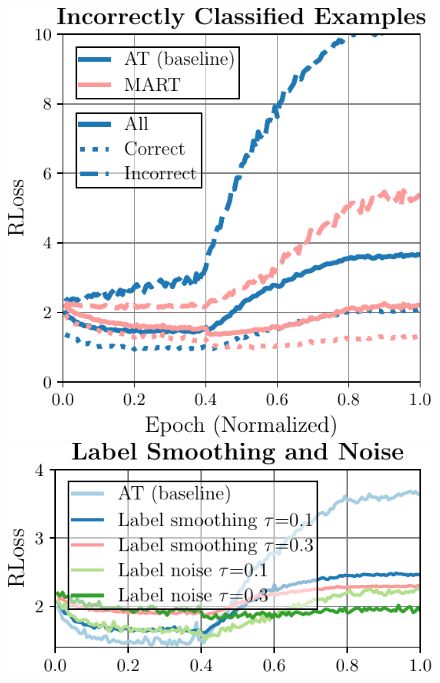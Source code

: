 \begin{figure}[t]
	\centering
	\vspace*{-0.2cm}
	\begin{minipage}[t]{0.2\textwidth}
		\vspace*{0px}
		
		\includegraphics[width=\textwidth]{plots_main_understanding_incorrect2}
	\end{minipage}
	\hspace*{1px}
	\begin{minipage}[t]{0.175\textwidth}
		\vspace*{0px}
		
		\includegraphics[width=\textwidth]{plots_main_understanding_ls_loss}
		\vspace*{-9px}
		

\end{minipage}
\end{figure}
